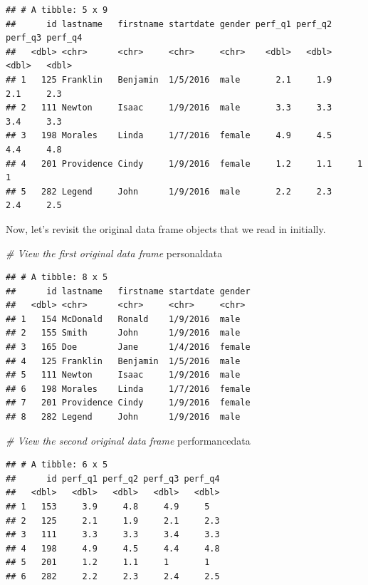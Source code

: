\documentclass[]{book}
\newenvironment{Shaded}{\begin{snugshade}}{\end{snugshade}}
\newcommand{\CommentTok}[1]{\textcolor[rgb]{0.56,0.35,0.01}{\textit{#1}}}
\newcommand{\NormalTok}[1]{#1}
\begin{document}
\begin{verbatim}
## # A tibble: 5 x 9
##      id lastname   firstname startdate gender perf_q1 perf_q2 perf_q3 perf_q4
##   <dbl> <chr>      <chr>     <chr>     <chr>    <dbl>   <dbl>   <dbl>   <dbl>
## 1   125 Franklin   Benjamin  1/5/2016  male       2.1     1.9     2.1     2.3
## 2   111 Newton     Isaac     1/9/2016  male       3.3     3.3     3.4     3.3
## 3   198 Morales    Linda     1/7/2016  female     4.9     4.5     4.4     4.8
## 4   201 Providence Cindy     1/9/2016  female     1.2     1.1     1       1  
## 5   282 Legend     John      1/9/2016  male       2.2     2.3     2.4     2.5
\end{verbatim}

Now, let's revisit the original data frame objects that we read in
initially.

\begin{Shaded}
\begin{Highlighting}[]
\CommentTok{# View the first original data frame}
\NormalTok{personaldata}
\end{Highlighting}
\end{Shaded}

\begin{verbatim}
## # A tibble: 8 x 5
##      id lastname   firstname startdate gender
##   <dbl> <chr>      <chr>     <chr>     <chr> 
## 1   154 McDonald   Ronald    1/9/2016  male  
## 2   155 Smith      John      1/9/2016  male  
## 3   165 Doe        Jane      1/4/2016  female
## 4   125 Franklin   Benjamin  1/5/2016  male  
## 5   111 Newton     Isaac     1/9/2016  male  
## 6   198 Morales    Linda     1/7/2016  female
## 7   201 Providence Cindy     1/9/2016  female
## 8   282 Legend     John      1/9/2016  male
\end{verbatim}

\begin{Shaded}
\begin{Highlighting}[]
\CommentTok{# View the second original data frame}
\NormalTok{performancedata}
\end{Highlighting}
\end{Shaded}

\begin{verbatim}
## # A tibble: 6 x 5
##      id perf_q1 perf_q2 perf_q3 perf_q4
##   <dbl>   <dbl>   <dbl>   <dbl>   <dbl>
## 1   153     3.9     4.8     4.9     5  
## 2   125     2.1     1.9     2.1     2.3
## 3   111     3.3     3.3     3.4     3.3
## 4   198     4.9     4.5     4.4     4.8
## 5   201     1.2     1.1     1       1  
## 6   282     2.2     2.3     2.4     2.5
\end{verbatim}
\end{document}
